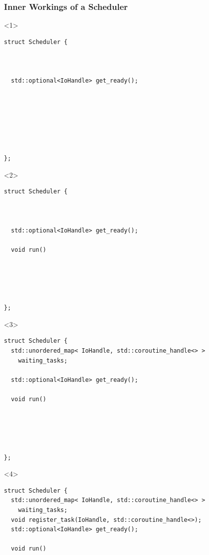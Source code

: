 \documentclass[aspectratio=169]{beamer}
\begin{document}
\begin{frame}[fragile]

  \frametitle{Inner Workings of a Scheduler}

  \begin{onlyenv}<1>
  \begin{lstlisting}[style=cpp20]
struct Scheduler {
  
  
  
  std::optional<IoHandle> get_ready();
  
  
  
  
  
  
  
};
  \end{lstlisting}
  \end{onlyenv}

  \begin{onlyenv}<2>
  \begin{lstlisting}[style=cpp20]
struct Scheduler {
  
  
  
  std::optional<IoHandle> get_ready();
  
  void run()
  
  
  
  
  
};
  \end{lstlisting}
  \end{onlyenv}

  \begin{onlyenv}<3>
  \begin{lstlisting}[style=cpp20]
struct Scheduler {
  std::unordered_map< IoHandle, std::coroutine_handle<> >
    waiting_tasks;
  
  std::optional<IoHandle> get_ready();
  
  void run()
  
  
  
  
  
};
  \end{lstlisting}
  \end{onlyenv}
  
  \begin{onlyenv}<4>
  \begin{lstlisting}[style=cpp20]
struct Scheduler {
  std::unordered_map< IoHandle, std::coroutine_handle<> >
    waiting_tasks;
  void register_task(IoHandle, std::coroutine_handle<>);
  std::optional<IoHandle> get_ready();
  
  void run()
  
  
  
  
  

\end{lstlisting}
\end{onlyenv}
\end{frame}
\end{document}
